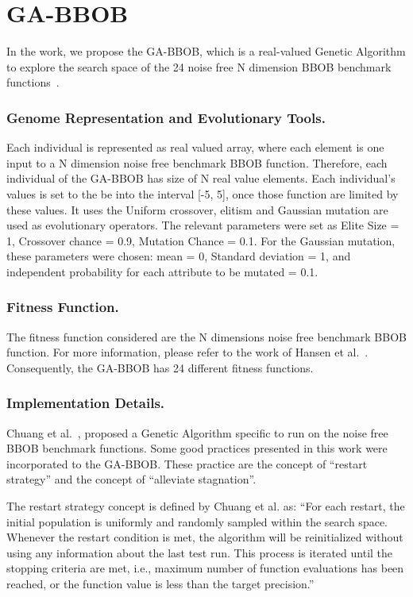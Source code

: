 \section{GA-BBOB}\label{sec:proposed:ga-bbob}

In the work, we propose the GA-BBOB, which is a real-valued Genetic Algorithm to explore the search space of the 24 noise free N dimension BBOB benchmark functions~\cite{hansen2010real}.

\subsubsection*{Genome Representation and Evolutionary Tools.}
Each individual is represented as real valued array, where each element is one input to a N dimension noise free benchmark BBOB function. Therefore, each individual of the GA-BBOB has size of N real value elements. Each individual's values is set to the be into the interval [-5, 5], once those function are limited by these values. It uses the Uniform crossover, elitism and Gaussian mutation are used as evolutionary operators. The relevant parameters were set as Elite Size = 1, Crossover chance = 0.9, Mutation Chance = 0.1. For the Gaussian mutation, these parameters were chosen: mean = 0, Standard deviation = 1, and independent probability for each attribute to be mutated = 0.1.


\subsubsection*{Fitness Function.}
The fitness function considered are the N dimensions noise free benchmark BBOB function. For more information, please refer to the work of Hansen et al.~\cite{hansen2010real}.
Consequently, the GA-BBOB has 24 different fitness functions. 


\subsubsection*{Implementation Details.}
Chuang et al.~\cite{chuang2012black}, proposed a Genetic Algorithm specific to run on the noise free BBOB benchmark functions. Some good practices presented in this work were incorporated to the GA-BBOB. These practice are the concept of ``restart strategy'' and the concept of ``alleviate stagnation''.

The restart strategy concept is defined by Chuang et al. as: ``For each restart, the initial population  is uniformly and randomly sampled within the search space. Whenever the restart condition is met, the algorithm will be reinitialized without using any information about the last test run. This process is iterated until the stopping criteria are met, i.e., maximum number of function evaluations has been reached, or the function value is less than the target precision.''


